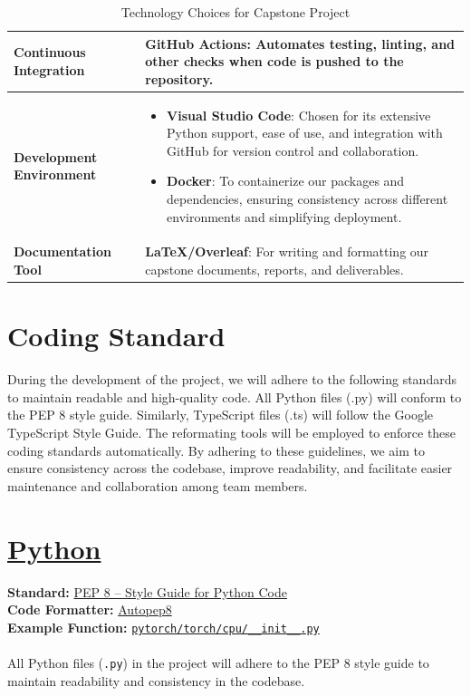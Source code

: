\documentclass{article}
\begin{document}
\begin{table}[h!]
\begin{tabularx}{\textwidth}{| >{\raggedright\arraybackslash}m{3.5cm} | >{\raggedright\arraybackslash}X |}
        \textbf{Continuous Integration} & \textbf{GitHub Actions}: Automates testing, linting, and other checks when code is pushed to the repository. \\ \hline
        \textbf{Development Environment} & \begin{itemize}
          \item \textbf{Visual Studio Code}: Chosen for its extensive Python support, ease of use, and integration with GitHub for version control and collaboration.
          \item \textbf{Docker}: To containerize our packages and dependencies, ensuring consistency across different environments and simplifying deployment.
      \end{itemize}\\ \hline
        \textbf{Documentation Tool} & \textbf{LaTeX/Overleaf}: For writing and formatting our capstone documents, reports, and deliverables. \\ \hline
    \end{tabularx}
    \caption{Technology Choices for Capstone Project}
\end{table}

\section{Coding Standard}
During the development of the project, we will adhere to the following standards to maintain readable and high-quality code. All Python files (.py) will conform to the PEP 8 style guide. Similarly, TypeScript files (.ts) will follow the Google TypeScript Style Guide. The reformating tools will be employed to enforce these coding standards automatically. By adhering to these guidelines, we aim to ensure consistency across the codebase, improve readability, and facilitate easier maintenance and collaboration among team members.

\newpage{}
\section*{\href{https://github.com/python/cpython}{Python}}

\textbf{Standard:} \href{https://peps.python.org/pep-0008/}{PEP 8 – Style Guide for Python Code} \\
\textbf{Code Formatter:} \href{https://github.com/hhatto/autopep8}{Autopep8} \\
\textbf{Example Function:} \texttt{\href{https://github.com/pytorch/pytorch/blob/main/torch/cpu/__init__.py}{pytorch/torch/cpu/\_\_init\_\_.py}} \\\\
All Python files (\texttt{.py}) in the project will adhere to the PEP 8 style guide to maintain readability and consistency in the codebase.
\end{document}
